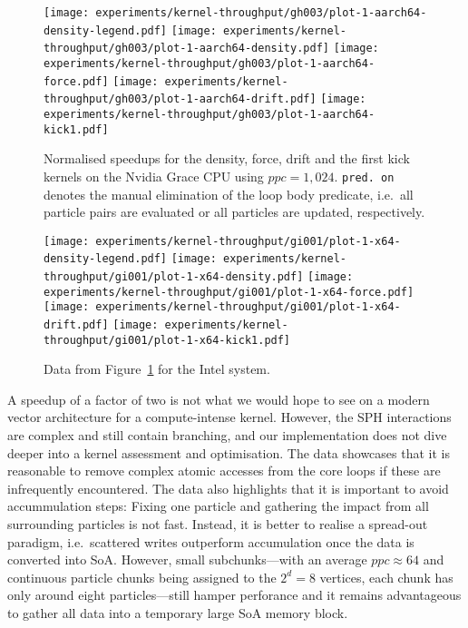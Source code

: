 \begin{figure}[H]
\centering
 \texttt{[image: experiments/kernel-throughput/gh003/plot-1-aarch64-density-legend.pdf]}
 \texttt{[image: experiments/kernel-throughput/gh003/plot-1-aarch64-density.pdf]}
 \texttt{[image: experiments/kernel-throughput/gh003/plot-1-aarch64-force.pdf]}
 \texttt{[image: experiments/kernel-throughput/gh003/plot-1-aarch64-drift.pdf]}
 \texttt{[image: experiments/kernel-throughput/gh003/plot-1-aarch64-kick1.pdf]}
 \caption{
   Normalised speedups for the density, force, drift and the first kick kernels on the Nvidia Grace CPU using $ppc=1,024$.
   \texttt{pred.~on} denotes the manual elimination of the loop body predicate, i.e.~all particle pairs are evaluated or all particles are updated, respectively.
   \label{figure:cpu:overhead:Grace}
 }
\end{figure}



\begin{figure}[htb]
\centering
 \texttt{[image: experiments/kernel-throughput/gi001/plot-1-x64-density-legend.pdf]}
 \texttt{[image: experiments/kernel-throughput/gi001/plot-1-x64-density.pdf]}
 \texttt{[image: experiments/kernel-throughput/gi001/plot-1-x64-force.pdf]}
 \texttt{[image: experiments/kernel-throughput/gi001/plot-1-x64-drift.pdf]}
 \texttt{[image: experiments/kernel-throughput/gi001/plot-1-x64-kick1.pdf]}
  \caption{
    Data from Figure~\ref{figure:cpu:overhead:Grace} for the Intel system.
    \label{figure:cpu:overhead:Intel}
  }
\end{figure}





%
%
A speedup of a factor of two is not what we would hope to see on a modern vector architecture for a compute-intense kernel.
However, the SPH interactions are complex and still contain branching, and our implementation does not dive deeper into a kernel assessment and optimisation.
The data showcases that it is reasonable to remove complex atomic accesses from the core loops if these are infrequently encountered.
The data also highlights that it is important to avoid accummulation steps:
Fixing one particle and gathering the impact from all surrounding particles is not fast.
Instead, it is better to realise a spread-out paradigm, i.e.~scattered writes outperform accumulation once the data is converted into SoA.
However, small subchunks---with an average $ppc \approx 64$ and continuous particle chunks being assigned to the $2^d=8$ vertices, each chunk has only around eight particles---still hamper perforance and it remains advantageous to gather all data into a temporary large SoA memory block.


